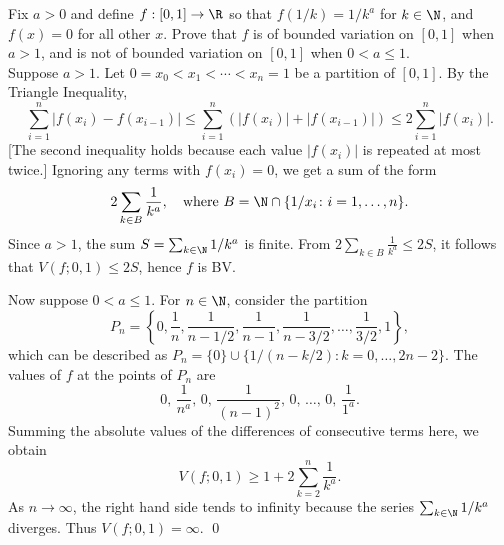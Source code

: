  
\begin{hwsol}
Fix $a>0$ and define $f: [0, 1] \to \R$ so that $f(1/k)=1/k^a$ for $k \in \N$, and $f(x)=0$ for all other $x$. Prove that $f$ is of bounded variation on $[0, 1]$ when $a>1$, and is not of bounded variation on $[0, 1]$ when $0 < a \leq 1$. \\

\pf Suppose $a > 1$. Let $0= x_0 < x_1 < \cdots < x_n= 1$ be a partition of $[0, 1]$. By the Triangle Inequality, 
        \[
        \sum_{i=1}^n |f(x_i)-f(x_{i-1})| \leq \sum_{i=1}^n ( |f(x_i)| + |f(x_{i-1})| ) \leq 2 \sum_{i=1}^n |f(x_i)|. 
        \]
[The second inequality holds because each value $|f(x_i)|$ is repeated at most twice.]  Ignoring any terms with $f(x_i)=0$, we get a sum of the form 
        \[
        2 \sum_{k \in B} \frac{1}{k^a},\quad \text{where } B= \N \cap \{ 1/x_i \colon i=1,\dots, n \}. 
        \]
Since $a>1$, the sum $S= \sum_{k\in \N}1/k^a$ is finite. From $2 \sum_{k \in B} \frac{1}{k^a} \leq 2S$, it follows that $V(f; 0,1) \leq 2S$, hence $f$ is BV. 

Now suppose $0 < a \leq 1$. For $n \in \N$, consider the partition 
        \[
        P_n= \left\{ 0, \frac{1}{n} , \frac{1}{n-1/2}, \frac{1}{n-1}, \frac{1}{n-3/2}, \ldots, 
        \frac{1}{3/2}, 1 \right\},
        \]
which can be described as $P_n= \{0\} \cup \{ 1/(n-k/2) \colon k=0,\ldots, 2n-2 \}$. The values of $f$ at the points of $P_n$ are 
        \[
        0, \,\frac{1}{n^a},\, 0, \,\frac{1}{(n-1)^2},\, 0,\, \dots,\, 0,\, \frac{1}{1^a}.
        \]
Summing the absolute values of the differences of consecutive terms here, we obtain 
        \[
        V(f; 0,1) \geq 1 + 2 \sum_{k=2}^n \frac{1}{k^a}.
        \]
As $n \to \infty$, the right hand side tends to infinity because the series $\sum_{k \in \N} 1/k^a$ diverges. Thus  $V(f;0, 1)= \infty$. \qed \\
\end{hwsol}


